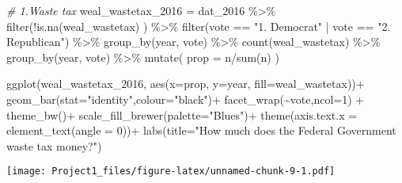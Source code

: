\documentclass[
]{article}
\newenvironment{Shaded}{\begin{snugshade}}{\end{snugshade}}
\newcommand{\AttributeTok}[1]{\textcolor[rgb]{0.77,0.63,0.00}{#1}}
\newcommand{\CommentTok}[1]{\textcolor[rgb]{0.56,0.35,0.01}{\textit{#1}}}
\newcommand{\DecValTok}[1]{\textcolor[rgb]{0.00,0.00,0.81}{#1}}
\newcommand{\FunctionTok}[1]{\textcolor[rgb]{0.00,0.00,0.00}{#1}}
\newcommand{\NormalTok}[1]{#1}
\newcommand{\OtherTok}[1]{\textcolor[rgb]{0.56,0.35,0.01}{#1}}
\newcommand{\SpecialCharTok}[1]{\textcolor[rgb]{0.00,0.00,0.00}{#1}}
\newcommand{\StringTok}[1]{\textcolor[rgb]{0.31,0.60,0.02}{#1}}
\begin{document}
\begin{Shaded}
\begin{Highlighting}[]
\CommentTok{\# 1.Waste tax}
\NormalTok{weal\_wastetax\_2016 }\OtherTok{=}\NormalTok{ dat\_2016 }\SpecialCharTok{\%\textgreater{}\%}
  \FunctionTok{filter}\NormalTok{(}\SpecialCharTok{!}\FunctionTok{is.na}\NormalTok{(weal\_wastetax) ) }\SpecialCharTok{\%\textgreater{}\%}
  \FunctionTok{filter}\NormalTok{(vote }\SpecialCharTok{==} \StringTok{"1. Democrat"} \SpecialCharTok{|}\NormalTok{ vote }\SpecialCharTok{==} \StringTok{"2. Republican"}\NormalTok{) }\SpecialCharTok{\%\textgreater{}\%}
  \FunctionTok{group\_by}\NormalTok{(year, vote) }\SpecialCharTok{\%\textgreater{}\%}
  \FunctionTok{count}\NormalTok{(weal\_wastetax) }\SpecialCharTok{\%\textgreater{}\%}
  \FunctionTok{group\_by}\NormalTok{(year, vote) }\SpecialCharTok{\%\textgreater{}\%}
  \FunctionTok{mutate}\NormalTok{(}
    \AttributeTok{prop =}\NormalTok{ n}\SpecialCharTok{/}\FunctionTok{sum}\NormalTok{(n)}
\NormalTok{  )}

\FunctionTok{ggplot}\NormalTok{(weal\_wastetax\_2016,}
       \FunctionTok{aes}\NormalTok{(}\AttributeTok{x=}\NormalTok{prop, }\AttributeTok{y=}\NormalTok{year, }\AttributeTok{fill=}\NormalTok{weal\_wastetax))}\SpecialCharTok{+}
  \FunctionTok{geom\_bar}\NormalTok{(}\AttributeTok{stat=}\StringTok{"identity"}\NormalTok{,}\AttributeTok{colour=}\StringTok{"black"}\NormalTok{)}\SpecialCharTok{+}
  \FunctionTok{facet\_wrap}\NormalTok{(}\SpecialCharTok{\textasciitilde{}}\NormalTok{vote,}\AttributeTok{ncol=}\DecValTok{1}\NormalTok{) }\SpecialCharTok{+}
  \FunctionTok{theme\_bw}\NormalTok{()}\SpecialCharTok{+}
  \FunctionTok{scale\_fill\_brewer}\NormalTok{(}\AttributeTok{palette=}\StringTok{"Blues"}\NormalTok{)}\SpecialCharTok{+}
  \FunctionTok{theme}\NormalTok{(}\AttributeTok{axis.text.x =} \FunctionTok{element\_text}\NormalTok{(}\AttributeTok{angle =} \DecValTok{0}\NormalTok{))}\SpecialCharTok{+}
  \FunctionTok{labs}\NormalTok{(}\AttributeTok{title=}\StringTok{"How much does the Federal Government waste tax money?"}\NormalTok{)}
\end{Highlighting}
\end{Shaded}

\texttt{[image: Project1\_files/figure-latex/unnamed-chunk-9-1.pdf]}
\end{document}
